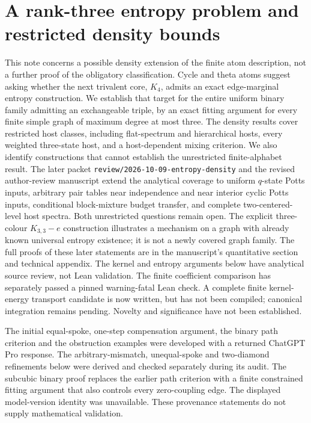 
\section{A rank-three entropy problem and restricted density bounds}
\label{sec:rank-three-entropy-research}

This note concerns a possible density extension of the finite atom description,
not a further proof of the obligatory classification.  Cycle and theta atoms
suggest asking whether the next trivalent core, $K_4$, admits an exact
edge-marginal entropy construction.  We establish that target for the entire
uniform binary family admitting an exchangeable triple, by an exact fitting
argument for every finite simple graph of maximum degree at most three.
The density results cover restricted host classes, including flat-spectrum
and hierarchical hosts, every weighted three-state host, and a host-dependent
mixing criterion.  We also identify constructions that cannot establish the
unrestricted finite-alphabet result.
The later packet \texttt{review/2026-10-09-entropy-density} and the revised
author-review manuscript extend the analytical coverage to uniform $q$-state
Potts inputs, arbitrary pair tables near independence and near interior
cyclic Potts inputs, conditional block-mixture budget transfer, and complete
two-centered-level host spectra.  Both unrestricted questions remain open.
The explicit three-colour $K_{3,3}-e$ construction illustrates a mechanism
on a graph with already known universal entropy existence; it is not a
newly covered graph family.  The full proofs of these later statements are
in the manuscript's quantitative section and technical appendix.
The kernel and entropy arguments below have analytical source review,
not Lean validation.  The finite coefficient comparison has separately
passed a pinned warning-fatal Lean check.  A complete finite kernel-energy
transport candidate is now written, but has not been compiled;
canonical integration remains pending.  Novelty and significance
have not been established.

The initial equal-spoke, one-step compensation argument, the binary path
criterion and the obstruction examples were developed with a returned ChatGPT
Pro response.  The arbitrary-mismatch, unequal-spoke and two-diamond
refinements below were derived and checked separately during its audit.
The subcubic binary proof replaces the earlier path criterion with a finite
constrained fitting argument that also controls every zero-coupling edge.
The displayed model-version identity was unavailable.  These provenance
statements do not supply mathematical validation.


